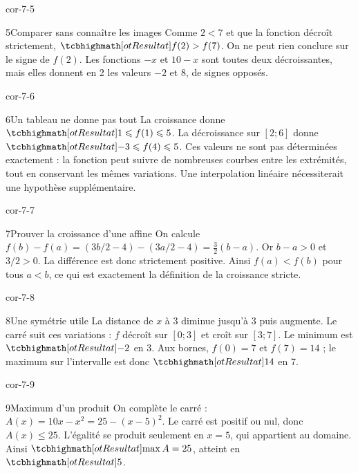 \begin{blocLivre}{cor-7-5}
\begin{corrige}{5}{Comparer sans connaître les images}
Comme $2<7$ et que la fonction décroît strictement, $\res{f(2)>f(7)}$. On ne peut rien conclure sur le signe de $f(2)$. Les fonctions $-x$ et $10-x$ sont toutes deux décroissantes, mais elles donnent en 2 les valeurs $-2$ et 8, de signes opposés.
\end{corrige}
\end{blocLivre}
\begin{blocLivre}{cor-7-6}
\begin{corrige}{6}{Un tableau ne donne pas tout}
La croissance donne $\res{1\le f(1)\le5}$. La décroissance sur $[2;6]$ donne $\res{-3\le f(4)\le5}$. Ces valeurs ne sont pas déterminées exactement : la fonction peut suivre de nombreuses courbes entre les extrémités, tout en conservant les mêmes variations. Une interpolation linéaire nécessiterait une hypothèse supplémentaire.
\label{fig-cor-7-6}
\end{corrige}
\end{blocLivre}
\begin{blocLivre}{cor-7-7}
\begin{corrige}{7}{Prouver la croissance d’une affine}
On calcule $f(b)-f(a)=(3b/2-4)-(3a/2-4)=\tfrac32(b-a)$. Or $b-a>0$ et $3/2>0$. La différence est donc strictement positive. Ainsi $f(a)<f(b)$ pour tous $a<b$, ce qui est exactement la définition de la croissance stricte.
\end{corrige}
\end{blocLivre}
\begin{blocLivre}{cor-7-8}
\begin{corrige}{8}{Une symétrie utile}
La distance de $x$ à 3 diminue jusqu’à 3 puis augmente. Le carré suit ces variations : $f$ décroît sur $[0;3]$ et croît sur $[3;7]$. Le minimum est $\res{-2}$ en 3. Aux bornes, $f(0)=7$ et $f(7)=14$ ; le maximum sur l’intervalle est donc $\res{14}$ en 7.
\label{fig-cor-7-8}
\end{corrige}
\end{blocLivre}
\begin{blocLivre}{cor-7-9}
\begin{corrige}{9}{Maximum d’un produit}
On complète le carré : $A(x)=10x-x^2=25-(x-5)^2$. Le carré est positif ou nul, donc $A(x)\le25$. L’égalité se produit seulement en $x=5$, qui appartient au domaine. Ainsi $\res{\max A=25}$, atteint en $\res5$.
\label{fig-cor-7-9}
\end{corrige}
\end{blocLivre}
